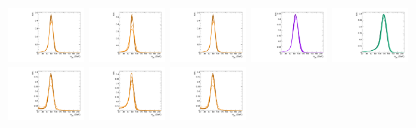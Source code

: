 \begin{figure}[htbp]
  \centering
  \includegraphics[width=0.18\textwidth]{fig/2Dfit/templateSignalVsMX_fromDC_GbuToWW_MJJ_mu_HP_bb_LDy.pdf}
  \includegraphics[width=0.18\textwidth]{fig/2Dfit/templateSignalVsMX_fromDC_RadToWW_MJJ_mu_HP_bb_LDy.pdf}
  \includegraphics[width=0.18\textwidth]{fig/2Dfit/templateSignalVsMX_fromDC_ZprToWW_MJJ_mu_HP_bb_LDy.pdf}
  \includegraphics[width=0.18\textwidth]{fig/2Dfit/templateSignalVsMX_fromDC_WprToWZ_MJJ_mu_HP_bb_LDy.pdf}
  \includegraphics[width=0.18\textwidth]{fig/2Dfit/templateSignalVsMX_fromDC_WprToWH_MJJ_mu_HP_bb_LDy.pdf}\\
  \includegraphics[width=0.18\textwidth]{fig/2Dfit/templateSignalVsMX_fromDC_GbuToWW_MJJ_mu_LP_bb_LDy.pdf}
  \includegraphics[width=0.18\textwidth]{fig/2Dfit/templateSignalVsMX_fromDC_RadToWW_MJJ_mu_LP_bb_LDy.pdf}
  \includegraphics[width=0.18\textwidth]{fig/2Dfit/templateSignalVsMX_fromDC_ZprToWW_MJJ_mu_LP_bb_LDy.pdf}

\end{figure}
